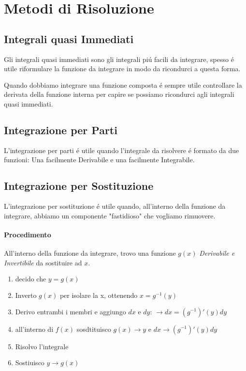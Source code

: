 \documentclass[12pt, a4paper, openany]{book}
\begin{document}
\section{Metodi di Risoluzione}
\subsection{Integrali quasi Immediati}
Gli integrali quasi immediati sono gli integrali piú facili da integrare, spesso é utile 
riformulare la funzione da integrare in modo da ricondurci a questa forma.

Quando dobbiamo integrare una funzione composta é sempre utile controllare la derivata della funzione interna per capire se possiamo
ricondurci agli integrali quasi immediati.


\subsection{Integrazione per Parti}
L'integrazione per parti é utile quando l'integrale da risolvere é formato da due funzioni:
Una facilmente Derivabile e una facilmente Integrabile.

\subsection{Integrazione per Sostituzione}
L'integrazione per sostituzione é utile quando, all'interno della funzione da integrare,
abbiamo un componente "fastidioso" che vogliamo rimuovere.
\paragraph{Procedimento}
All'interno della funzione da integrare, trovo una funzione $g(x)$ \emph{Derivabile e Invertibile}
 da sostituire ad $x$.
\begin{enumerate}
	\item decido che $y=g(x)$
	\item Inverto $g(x)$ per isolare la x, ottenendo $x=g^{-1}(y)$
	\item Derivo entrambi i membri e aggiungo $dx$ e $dy$: $\to dx=(g^{-1})'(y)dy$
	\item all'interno di $f(x)$ sosdtituisco $g(x) \to y$ e $dx \to (g^{-1})'(y)dy$
	\item Risolvo l'integrale
	\item Sostiuisco $y \to g(x)$
\end{enumerate}
\end{document}
